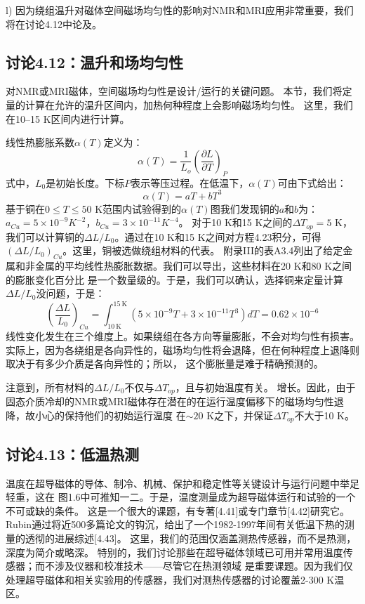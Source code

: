 l) 因为绕组温升对磁体空间磁场均匀性的影响对NMR和MRI应用非常重要，我们将在讨论4.12中论及。



\subsection{讨论4.12：温升和场均匀性}
对NMR或MRI磁体，空间磁场均匀性是设计/运行的关键问题。
本节，我们将定量的计算在允许的温升区间内，加热何种程度上会影响磁场均匀性。
这里，我们在10–15 K区间内进行计算。

线性热膨胀系数$\alpha(T)$定义为：
\begin{equation}%
\alpha(T)=\frac{1}{L_o}(\frac{\partial L}{\partial T})_P
\end{equation}
式中，$L_0$是初始长度。下标$P$表示等压过程。在低温下，$\alpha(T)$可由下式给出：
\begin{equation}%
\alpha(T)=aT+bT^3
\end{equation}
基于铜在$0\le T\le 50$ K范围内试验得到的$\alpha(T)$图我们发现铜的$a$和$b$为：
$a_{Cu}= 5\times 10^{-9} K^{−2}$，$b_{Cu} = 3\times 10^{−11} K^{−4}$。
对于10 K和15 K之间的$\Delta T_{op} = 5$ K，我们可以计算铜的$\Delta L/L_0$。通过在10 K和15 K之间对方程4.23积分，可得
$(\Delta L/L_0)_{Cu}$。这里，铜被选做绕组材料的代表。
附录III的表A3.4列出了给定金属和非金属的平均线性热膨胀数据。我们可以导出，这些材料在20 K和80 K之间的膨胀变化百分比
是一个数量级的。于是，我们可以确认，选择铜来定量计算$\Delta L/L_0$没问题，于是：
\begin{equation}%
\left(\frac{\Delta L}{L_0}\right)_{Cu}=\int_{10\ \mathrm{K}}^{15\ \mathrm{K}}(5\times 10^{-9}T+3\times 10^{-11}T^3)dT=0.62\times 10^{-6}
\end{equation}
线性变化发生在三个维度上。如果绕组在各方向等量膨胀，不会对均匀性有损害。
实际上，因为各绕组是各向异性的，磁场均匀性将会退降，但在何种程度上退降则取决于有多少介质是各向异性的；所以，
这个膨胀量是难于精确预测的。

注意到，所有材料的$\Delta L/L_0$不仅与$\Delta T_{op}$，且与初始温度有关。
增长。因此，由于固态介质冷却的NMR或MRI磁体存在潜在的在运行温度偏移下的磁场均匀性退降，故小心的保持他们的初始运行温度
在$\sim 20$ K之下，并保证$\Delta T_{op}$不大于10 K。

\subsection{讨论4.13：低温热测}
温度在超导磁体的导体、制冷、机械、保护和稳定性等关键设计与运行问题中举足轻重，这在
图1.6中可推知一二。于是，温度测量成为超导磁体运行和试验的一个不可或缺的条件。
这是一个很大的课题，有专著[4.41]或专门章节[4.42]研究它。
Rubin通过将近500多篇论文的钩沉，给出了一个1982-1997年间有关低温下热的测量的透彻的进展综述[4.43]。
这里，我们的范围仅涵盖测热传感器，而不是热测，深度为简介或略深。
特别的，我们讨论那些在超导磁体领域已可用并常用温度传感器；而不涉及仪器和校准技术——尽管它在热测领域
是重要课题。因为我们仅处理超导磁体和相关实验用的传感器，我们对测热传感器的讨论覆盖2-300 K温区。

